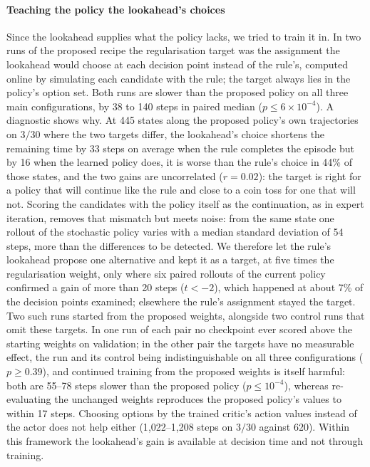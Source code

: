 \documentclass[final,5p,times,twocolumn]{elsarticle}
\begin{document}
\paragraph{Teaching the policy the lookahead's choices}
Since the lookahead supplies what the policy lacks, we tried to train it in. In two runs of the
proposed recipe the regularisation target was the assignment the lookahead would choose at each
decision point instead of the rule's, computed online by simulating each candidate with the rule;
the target always lies in the policy's option set. Both runs are slower than the proposed policy
on all three main configurations, by 38 to 140 steps in paired median ($p \le 6 \times 10^{-4}$).
A diagnostic shows why. At 445 states along the proposed policy's own trajectories on $3/30$
where the two targets differ, the lookahead's choice shortens the remaining time by 33 steps on
average when the rule completes the episode but by 16 when the learned policy does, it is worse
than the rule's choice in 44\% of those states, and the two gains are uncorrelated ($r = 0.02$):
the target is right for a policy that will continue like the rule and close to a coin toss for
one that will not. Scoring the candidates with the policy itself as the continuation, as in
expert iteration, removes that mismatch but meets noise: from the same state one rollout of the
stochastic policy varies with a median standard deviation of 54 steps, more than the differences
to be detected. We therefore let the rule's lookahead propose one alternative and kept it as a
target, at five times the regularisation weight, only where six paired rollouts of the current
policy confirmed a gain of more than 20 steps ($t < -2$), which happened at about 7\% of the
decision points examined; elsewhere the rule's assignment stayed the target. Two such runs started
from the proposed weights, alongside two control runs that omit these targets. In one run of each
pair no checkpoint ever scored above the starting weights on validation; in the other pair the
targets have no measurable effect, the run and its control being indistinguishable on all three
configurations ($p \ge 0.39$), and continued training from the proposed weights is itself
harmful: both are 55--78 steps slower than the proposed policy ($p \le 10^{-4}$), whereas
re-evaluating the unchanged weights reproduces the proposed policy's values to within 17 steps.
Choosing options by the trained critic's action values instead of the actor does not help either
(1{,}022--1{,}208 steps on $3/30$ against 620). Within this framework the lookahead's gain is
available at decision time and not through training.
\end{document}
